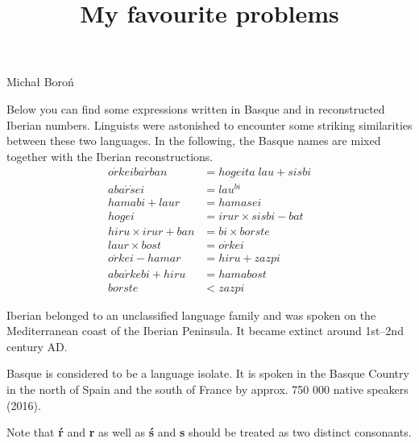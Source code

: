\documentclass[a4paper, 12pt]{article}
\author{}
\date{}
\title{\textbf{My favourite problems}\vspace{-4em}}
\begin{document}
\maketitle{}

\begin{lingproblem*}{Michał Boroń}

Below you can find some expressions written in Basque and in reconstructed Iberian numbers.
Linguists were astonished to encounter some striking similarities between these two languages.
In the following, the Basque names are mixed together with the Iberian reconstructions.
\begin{align}
o\acute{r}keiba\acute{r}ban &= hogeita\; lau + sisbi\label{eq:first} \\
aba\acute{r}\acute{s}ei &= lau^{bi} \\
hamabi + laur &= hamasei \\
hogei &= irur \times sisbi - bat \\
hiru \times irur + ban &= bi \times borste \\
laur \times bost &= o\acute{r}kei \\
o\acute{r}kei - hamar &= hiru + zazpi \\
aba\acute{r}kebi + hiru &= hamabost \\
borste &< zazpi\label{eq:last}
\end{align}

\begin{tasks}

\end{tasks}

\begin{langinfo}
Iberian belonged to an unclassified language family and
was spoken on the Mediterranean coast of the Iberian Peninsula.
It became extinct around 1st--2nd century AD.

Basque is considered to be a language isolate.
It is spoken in the Basque Country in the north of Spain and the south of France by approx. 750 000 native speakers (2016).

Note that \textbf{\'r} and \textbf{r} as well as \textbf{\'s} and \textbf{s} should be treated as two distinct consonants.
\end{langinfo}

\end{lingproblem*}
\end{document}
